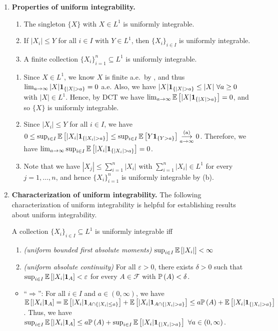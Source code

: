 \begin{enumerate}
\item\label{it:ui-prop} \textbf{Properties of uniform integrability.}
\begin{enumerate}
\item The singleton \(\{X\}\) with \(X\in L^1\) is uniformly integrable.
\item If \(|X_i|\le Y\) for all \(i\in I\) with \(Y\in L^1\), then \(\{X_i\}_{i\in
I}\) is uniformly integrable.
\item A finite collection \(\{X_i\}_{i=1}^{n}\subseteq L^1\) is
uniformly integrable.
\end{enumerate}
\begin{pf}
\begin{enumerate}
\item Since \(X\in L^1\), we know \(X\) is finite a.e.\ by
, and thus
\(\lim_{a\to\infty}|X|\indicset{|X|>a}=0\) a.e. Also, we have
\(|X|\indicset{|X|>a}\le|X|~\forall a\ge 0\) with \(|X|\in L^{1}\). Hence, by
DCT we have \(\lim_{a\to\infty}\expv{|X|\indicset{|X|>a}}=0\), and so \(\{X\}\)
is uniformly integrable.
\item Since \(|X_i|\le Y\) for all \(i\in I\), we have \(0\le\sup_{i\in
I}\expv{|X_i|\indicset{|X_i|>a}}\le\sup_{i\in
I}\expv{Y\indicset{Y>a}}\tox{a}{\text{(a)}}0\). Therefore,
we have \(\lim_{a\to\infty}\sup_{i\in I}\expv{|X_i|\indicset{|X_i|>a}}=0\).
\item Note that we have \(|X_j|\le\sum_{i=1}^{n}|X_i|\) with
\(\sum_{i=1}^{n}|X_i|\in L^1\) for every \(j=1,\dotsc,n\),
and hence \(\{X_i\}_{i=1}^{n}\) is uniformly integrable by (b).
\end{enumerate}
\end{pf}
\item \label{it:ui-char} \textbf{Characterization of uniform integrability.}
The following characterization of uniform integrability is helpful for
establishing results about uniform integrability.
\begin{theorem}
\label{thm:ui-char}
A collection \(\{X_i\}_{i\in I}\subseteq L^1\) is uniformly integrable iff
\begin{enumerate}
\item \emph{(uniform bounded first absolute moments)} \(\sup_{i\in
I}\mathbb{E}\left[|X_i|\right]<\infty\)
\item \emph{(uniform absolute continuity)} For all \(\varepsilon>0\), there
exists \(\delta>0\) such that \(\sup_{i\in I}\mathbb{E}\left[|X_i|\mathbf{1}_{A}\right]<\varepsilon\) for every \(A\in\mathcal{F}\) with \(\mathbb{P}\left(A\right)<\delta\).
\end{enumerate}
\end{theorem}
\begin{pf}
\begin{itemize}
\item ``\(\Rightarrow\)'': For all \(i\in I\) and \(a\in (0,\infty)\), we have
\(\expv{|X_i|\indic_{A}}=\expv{|X_i|\indic_{A\cap \{|X_i|\le a\}}}
+\expv{|X_i|\indic_{A\cap\{|X_i|>a\}}}\le
a\prob{A}+\expv{|X_i|\indicset{|X_i|>a}}\). Thus, we have \(\sup_{i\in
I}\expv{|X_i|\indic_{A}}\le a\prob{A}+\sup_{i\in
I}\expv{|X_i|\indicset{|X_i|>a}}~\forall a\in (0,\infty)\).


\end{itemize}
\end{pf}
\end{enumerate}
